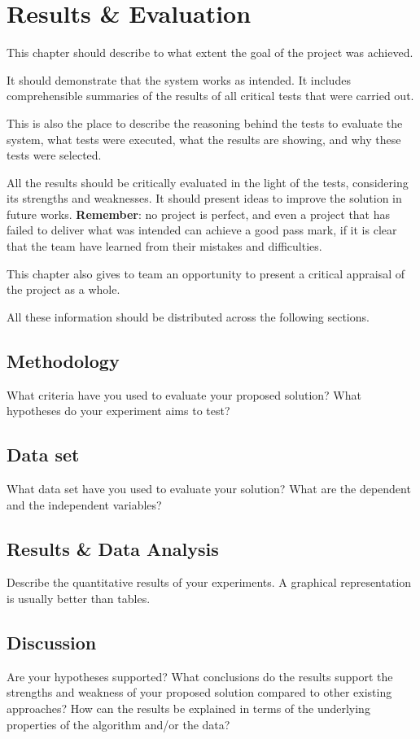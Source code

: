 
\chapter{Results \& Evaluation}\label{ch:results-evaluation}

This chapter should describe to what extent the goal of the project was achieved.

It should demonstrate that the system works as intended. It includes comprehensible summaries of the results of all critical tests that were carried out.

This is also the place to describe the reasoning behind the tests to evaluate the system, what tests were executed, what the results are showing, and why these tests were selected.

All the results should be critically evaluated in the light of the tests, considering its strengths and weaknesses. It should present ideas to improve the solution in future works. \textbf{Remember}: no project is perfect, and even a project that has failed to deliver what was intended can achieve a good pass mark, if it is clear that the team have learned from their mistakes and difficulties.

This chapter also gives to team an opportunity to present a critical appraisal of the project as a whole.

All these information should be distributed across the following sections.

\section{Methodology}\label{sec:methodology}

What criteria have you used to evaluate your proposed solution? What hypotheses do your experiment aims to test?


\section{Data set}\label{sec:data-set}

What data set have you used to evaluate your solution? What are the dependent and the independent variables?

\section{Results \& Data Analysis}\label{sec:results-data-analysis}

Describe the quantitative results of your experiments. A graphical representation is usually better than tables.

\section{Discussion}\label{sec:discussion}

Are your hypotheses supported? What conclusions do the results support the strengths and weakness of your proposed solution compared to other existing approaches? How can the results be explained in terms of the underlying properties of the algorithm and/or the data?